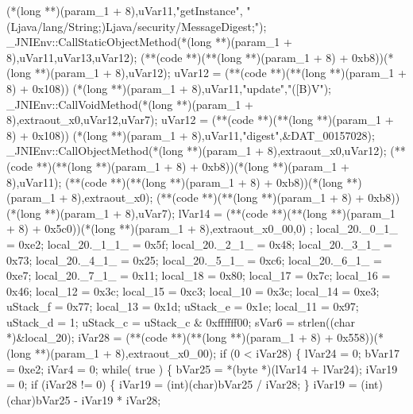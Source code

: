 \documentclass[
]{article}
\newenvironment{Shaded}{}{}
\newcommand{\NormalTok}[1]{#1}
\begin{document}
\begin{Shaded}
\begin{Highlighting}[]
\NormalTok{                     (*(long **)(param\_1 + 8),uVar11,"getInstance",}
\NormalTok{                      "(Ljava/lang/String;)Ljava/security/MessageDigest;");}
\NormalTok{  \_JNIEnv::CallStaticObjectMethod(*(long **)(param\_1 + 8),uVar11,uVar13,uVar12);}
\NormalTok{  (**(code **)(**(long **)(param\_1 + 8) + 0xb8))(*(long **)(param\_1 + 8),uVar12);}
\NormalTok{  uVar12 = (**(code **)(**(long **)(param\_1 + 8) + 0x108))}
\NormalTok{                     (*(long **)(param\_1 + 8),uVar11,"update","([B)V");}
\NormalTok{  \_JNIEnv::CallVoidMethod(*(long **)(param\_1 + 8),extraout\_x0,uVar12,uVar7);}
\NormalTok{  uVar12 = (**(code **)(**(long **)(param\_1 + 8) + 0x108))}
\NormalTok{                     (*(long **)(param\_1 + 8),uVar11,"digest",\&DAT\_00157028);}
\NormalTok{  \_JNIEnv::CallObjectMethod(*(long **)(param\_1 + 8),extraout\_x0,uVar12);}
\NormalTok{  (**(code **)(**(long **)(param\_1 + 8) + 0xb8))(*(long **)(param\_1 + 8),uVar11);}
\NormalTok{  (**(code **)(**(long **)(param\_1 + 8) + 0xb8))(*(long **)(param\_1 + 8),extraout\_x0);}
\NormalTok{  (**(code **)(**(long **)(param\_1 + 8) + 0xb8))(*(long **)(param\_1 + 8),uVar7);}
\NormalTok{  lVar14 = (**(code **)(**(long **)(param\_1 + 8) + 0x5c0))(*(long **)(param\_1 + 8),extraout\_x0\_00,0)}
\NormalTok{  ;}
\NormalTok{  local\_20.\_0\_1\_ = 0xe2;}
\NormalTok{  local\_20.\_1\_1\_ = 0x5f;}
\NormalTok{  local\_20.\_2\_1\_ = 0x48;}
\NormalTok{  local\_20.\_3\_1\_ = 0x73;}
\NormalTok{  local\_20.\_4\_1\_ = 0x25;}
\NormalTok{  local\_20.\_5\_1\_ = 0xc6;}
\NormalTok{  local\_20.\_6\_1\_ = 0xe7;}
\NormalTok{  local\_20.\_7\_1\_ = 0x11;}
\NormalTok{  local\_18 = 0x80;}
\NormalTok{  local\_17 = 0x7c;}
\NormalTok{  local\_16 = 0x46;}
\NormalTok{  local\_12 = 0x3c;}
\NormalTok{  local\_15 = 0xc3;}
\NormalTok{  local\_10 = 0x3c;}
\NormalTok{  local\_14 = 0xe3;}
\NormalTok{  uStack\_f = 0x77;}
\NormalTok{  local\_13 = 0x1d;}
\NormalTok{  uStack\_e = 0x1e;}
\NormalTok{  local\_11 = 0x97;}
\NormalTok{  uStack\_d = 1;}
\NormalTok{  uStack\_c = uStack\_c \& 0xffffff00;}
\NormalTok{  sVar6 = strlen((char *)\&local\_20);}
\NormalTok{  iVar28 = (**(code **)(**(long **)(param\_1 + 8) + 0x558))(*(long **)(param\_1 + 8),extraout\_x0\_00);}
\NormalTok{  if (0 \textless{} iVar28) \{}
\NormalTok{    lVar24 = 0;}
\NormalTok{    bVar17 = 0xe2;}
\NormalTok{    iVar4 = 0;}
\NormalTok{    while( true ) \{}
\NormalTok{      bVar25 = *(byte *)(lVar14 + lVar24);}
\NormalTok{      iVar19 = 0;}
\NormalTok{      if (iVar28 != 0) \{}
\NormalTok{        iVar19 = (int)(char)bVar25 / iVar28;}
\NormalTok{      \}}
\NormalTok{      iVar19 = (int)(char)bVar25 {-} iVar19 * iVar28;}

\end{Highlighting}
\end{Shaded}
\end{document}
